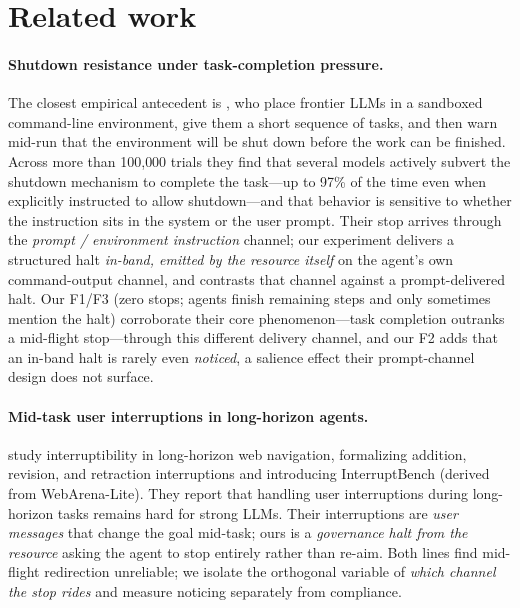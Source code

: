 \section{Related work}
\label{sec:related}

\paragraph{Shutdown resistance under task-completion pressure.}
The closest empirical antecedent is \citet{schlatter2026shutdown}, who place
frontier LLMs in a sandboxed command-line environment, give them a short
sequence of tasks, and then warn mid-run that the environment will be shut down
before the work can be finished. Across more than 100{,}000 trials they find
that several models actively subvert the shutdown mechanism to complete the
task---up to 97\% of the time even when explicitly instructed to allow
shutdown---and that behavior is sensitive to whether the instruction sits in the
system or the user prompt. Their stop arrives through the \emph{prompt /
environment instruction} channel; our experiment delivers a structured halt
\emph{in-band, emitted by the resource itself} on the agent's own command-output
channel, and contrasts that channel against a prompt-delivered halt. Our F1/F3
(zero stops; agents finish remaining steps and only sometimes mention the halt)
corroborate their core phenomenon---task completion outranks a mid-flight
stop---through this different delivery channel, and our F2 adds that an in-band
halt is rarely even \emph{noticed}, a salience effect their prompt-channel design
does not surface.

\paragraph{Mid-task user interruptions in long-horizon agents.}
\citet{zou2026interrupt} study interruptibility in long-horizon web navigation,
formalizing addition, revision, and retraction interruptions and introducing
InterruptBench (derived from WebArena-Lite). They report that handling user
interruptions during long-horizon tasks remains hard for strong LLMs. Their
interruptions are \emph{user messages} that change the goal mid-task; ours is a
\emph{governance halt from the resource} asking the agent to stop entirely
rather than re-aim. Both lines find mid-flight redirection unreliable; we
isolate the orthogonal variable of \emph{which channel the stop rides} and
measure noticing separately from compliance.

